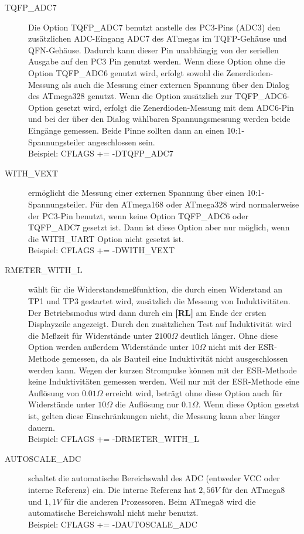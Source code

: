 \begin{description}
  \item[TQFP\_ADC7] Die Option TQFP\_ADC7 benutzt anstelle des PC3-Pins (ADC3) den zusätzlichen ADC-Eingang ADC7
des ATmegas im TQFP-Gehäuse und QFN-Gehäuse.
Dadurch kann dieser Pin unabhängig von der seriellen Ausgabe auf den PC3 Pin genutzt werden. Wenn diese Option 
ohne die Option TQFP\_ADC6 genutzt wird, erfolgt sowohl die Zenerdioden-Messung als auch die Messung einer externen
Spannung über den Dialog des ATmega328 genutzt. Wenn die Option zusätzlich zur TQFP\_ADC6-Option gesetzt wird,
erfolgt die Zenerdioden-Messung mit dem ADC6-Pin und bei der über den Dialog wählbaren Spannungsmessung werden
beide Eingänge gemessen. Beide Pinne sollten dann an einen 10:1-Spannungsteiler angeschlossen sein.\\
Beispiel: CFLAGS += -DTQFP\_ADC7

  \item[WITH\_VEXT] ermöglicht die Messung einer externen Spannung über einen 10:1-Spannungsteiler.
Für den ATmega168 oder ATmega328 wird normalerweise der PC3-Pin benutzt, wenn keine Option TQFP\_ADC6 oder
TQFP\_ADC7 gesetzt ist. Dann ist diese Option aber nur möglich, wenn die WITH\_UART Option nicht gesetzt ist.\\
Beispiel: CFLAGS += -DWITH\_VEXT 

  \item[RMETER\_WITH\_L] wählt für die Widerstandsmeßfunktion, die durch einen Widerstand an TP1 und TP3 gestartet wird,
zusätzlich die Messung von Induktivitäten. Der Betriebsmodus wird dann durch ein \textbf{[RL]} am Ende der ersten Displayzeile
angezeigt. Durch den zusätzlichen Test auf Induktivität wird die Meßzeit für Widerstände unter \(2100\Omega\) deutlich
länger. Ohne diese Option werden außerdem Widerstände unter \(10\Omega\) nicht mit der ESR-Methode gemessen,
da als Bauteil eine Induktivität nicht ausgeschlossen werden kann.
Wegen der kurzen Strompulse können mit der ESR-Methode keine Induktivitäten gemessen werden.
Weil nur mit der ESR-Methode eine Auflösung von \(0.01\Omega\) erreicht wird, beträgt ohne diese Option auch für 
Widerstände unter \(10\Omega\) die Auflösung nur \(0.1\Omega\).
Wenn diese Option gesetzt ist, gelten diese Einschränkungen nicht, die Messung kann aber länger dauern.\\
Beispiel: CFLAGS += -DRMETER\_WITH\_L

  \item[AUTOSCALE\_ADC] schaltet die automatische Bereichswahl des ADC (entweder VCC oder interne Referenz) ein.
Die interne Referenz hat \(2,56V\) für den ATmega8 und \(1,1V\) für die anderen Prozessoren.
Beim ATmega8 wird die automatische Bereichswahl nicht mehr benutzt.\\
Beispiel: CFLAGS += -DAUTOSCALE\_ADC


\end{description}

